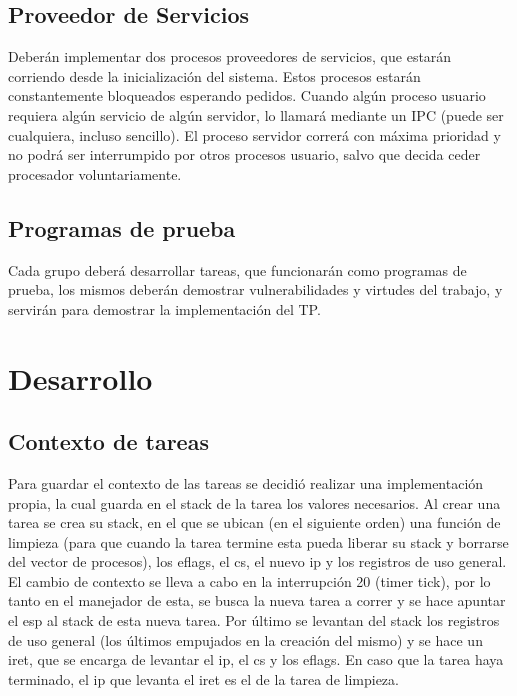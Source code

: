 \documentclass[a4paper,10pt]{article}
\begin{document}
\subsection{Proveedor de Servicios}
Deberán implementar dos procesos proveedores de servicios, que estarán corriendo 
desde la inicialización del sistema. Estos procesos estarán constantemente
bloqueados esperando pedidos. Cuando algún proceso usuario requiera algún
servicio de algún servidor, lo llamará mediante un IPC (puede ser cualquiera,
incluso sencillo). El proceso servidor correrá con máxima prioridad y no podrá
ser interrumpido por otros procesos usuario, salvo que decida ceder procesador
voluntariamente.

\subsection{Programas de prueba}
Cada grupo deberá desarrollar tareas, que funcionarán como programas de
prueba, los mismos deberán demostrar vulnerabilidades y virtudes del trabajo,
y servirán para demostrar la implementación del TP.


\newpage


\section{Desarrollo}

\subsection{Contexto de tareas}
Para guardar el contexto de las tareas se decidió realizar una implementación propia, 
la cual guarda en el stack de la tarea los valores necesarios. Al crear una tarea se crea
su stack, en el que se ubican (en el siguiente orden) una función de limpieza (para que 
cuando la tarea termine esta pueda liberar su stack y borrarse del vector de procesos), 
los eflags, el cs, el nuevo ip y los registros de uso general. \\
El cambio de contexto se lleva a cabo en la interrupción 20 (timer tick), por lo tanto 
en el manejador de esta, se busca la nueva tarea a correr y se hace apuntar el esp al stack 
de esta nueva tarea. Por último se levantan del stack los registros de uso general (los últimos 
empujados en la creación del mismo) y se hace un iret, que se encarga de levantar el ip, el cs 
y los eflags. En caso que la tarea haya terminado, el ip que levanta el iret es el de la tarea 
de limpieza.
\end{document}
